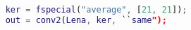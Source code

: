 \documentclass{subfiles}
\begin{document}
\begin{lstlisting}[language = MATLAB]
    %% loading Lena.png
    ker = fspecial("average", [21, 21]);
    out = conv2(Lena, ker, ``same");
\end{lstlisting}
\end{document}

